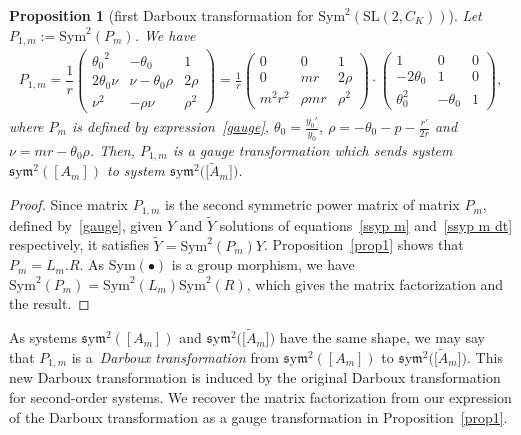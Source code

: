 \documentclass[10pt,a4paper]{amsart}
\numberwithin{equation}{section}
\newtheorem{Proposition}[Theorem]{Proposition}
 { \theoremstyle{definition}
\newtheorem{Definition}[Theorem]{Definition}
\newtheorem{Note}[Theorem]{Note}
\newtheorem{Example}[Theorem]{Example}
\newtheorem{Remark}[Theorem]{Remark} }
\def\Sym{\mathrm{Sym}}
\def\sym{\mathfrak{s}\mathrm{y}\mathfrak{m}}
\begin{document}
\begin{Proposition}[first Darboux transformation for $\Sym^2 (\mathrm{SL}(2,C_K))$] \label{thnudarsl21}
Let $P_{1,m}:= \Sym^2 (P_{m})$.
We have %
\begin{gather} \label{eq:DT sl2}
P_{1,m} = \dfrac{1}{r}
\begin{pmatrix} {\theta_0}^{2}&-\theta_0&1 \\ 2 \theta_0
\nu & \nu-\theta_0 \rho& 2 \rho \\
\nu^{2}& -\rho \nu&{\rho}^{2}
 	\end{pmatrix} 	=
	 \frac{1}{r} \begin{pmatrix} 0&0&1\\ 0&mr&2 \rho
\\ {m}^{2}{r}^{2}&\rho mr&{\rho}^{2}\end{pmatrix} \cdot
\begin{pmatrix} 1&0&0\\ -2 \theta_{{0}}
&1&0\\ \theta_{{0}}^{2}&-\theta_{{0}}&1
\end{pmatrix}\!,
\end{gather}
where $P_m$ is defined by expression~\eqref{gauge},
	$\theta_0= \frac{y_0'}{y_0}$, $\rho = -\theta_0- p - \frac{r'}{2r}$
	and $\nu=mr-\theta_0 \rho$.
Then, $P_{1,m}$ is a gauge transformation which sends system $\sym^2 ([A_m])$ to system $\sym^2 \big(\big[\widetilde{A}_m\big]\big)$.
\end{Proposition}

\begin{proof}Since matrix $P_{1,m}$ is the second symmetric power matrix of matrix $P_m$, defined by~\eqref{gauge}, given $Y$ and $\widetilde{Y}$ solutions of equations~\eqref{ssyp m} and~\eqref{ssyp m dt} respectively, it satisfies $\widetilde{Y} = \Sym^2 (P_{m}) Y$.
 Proposition~\ref{prop1} shows that $P_{m} = L_m. R$. As $\Sym(\bullet)$ is a group morphism, we have
$\Sym^2(P_m)=\Sym^2(L_m)\Sym^2(R)$, which gives the matrix factorization and the result.
\end{proof}

As systems $\sym^2 ([A_m])$ and $\sym^2 \big(\big[\widetilde{A}_m\big]\big)$ have the same shape, we may say that $P_{1,m}$ is a~\emph{Dar\-boux transformation} from $\sym^2 ([A_m])$ to $\sym^2 \big(\big[\widetilde{A}_m\big]\big)$.
This new Darboux transformation is induced by the original Darboux transformation for second-order systems. We recover the matrix factorization from our expression of the Darboux transformation as a gauge transformation in Proposition~\ref{prop1}.
\end{document}
